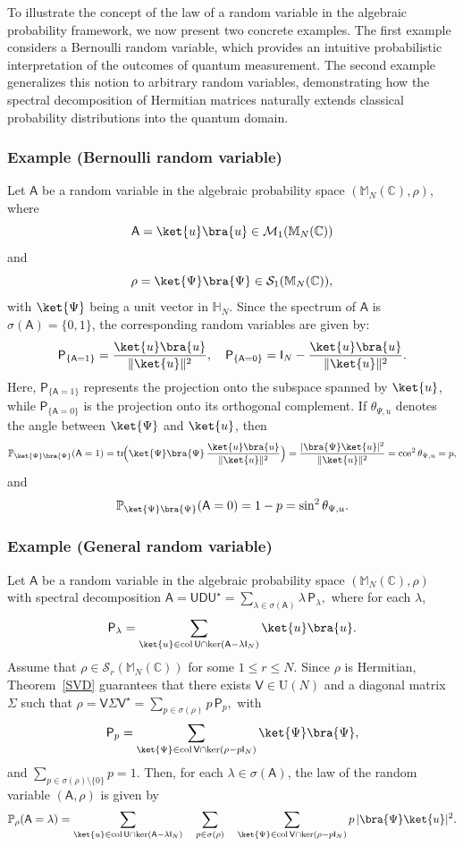 \documentclass[a4paper,11pt]{article}
\DeclareMathOperator{\tr}{tr}
\newcommand{\rD}{\mathsf{D}}
\newcommand{\rI}{\mathsf{I}}
\newcommand{\rP}{\mathsf{P}}
\newcommand{\rU}{\mathsf{U}}
\newcommand{\rV}{\mathsf{V}}
\newcommand{\rA}{\mathsf{A}}
\begin{document}
To illustrate the concept of the law of a random variable in the algebraic probability framework, we now present two concrete examples. The first example considers a Bernoulli random variable, which provides an intuitive probabilistic interpretation of the outcomes of quantum measurement. The second example generalizes this notion to arbitrary random variables, demonstrating how the spectral decomposition of Hermitian matrices naturally extends classical probability distributions into the quantum domain.

\subsubsection{Example (Bernoulli random variable)}
Let \(\rA\) be a random variable in the algebraic probability space \((\mathbb{M}_N(\mathbb{C}), \rho)\), where  
\[
\rA = \ket{u}\bra{u} \in \mathcal{M}_1(\mathbb{M}_N(\mathbb{C}))
\]
and  
\[
\rho = \ket{\Psi}\bra{\Psi} \in \mathcal{S}_1(\mathbb{M}_N(\mathbb{C})),
\]
with \(\ket{\Psi}\) being a unit vector in \(\mathbb{H}_N\).  
Since the spectrum of \(\rA\) is \(\sigma(\rA) = \{0,1\}\), the corresponding random variables are given by:
\[
\rP_{\{\rA = 1\}} = \frac{\ket{u}\bra{u}}{\|\ket{u}\|^2}, \quad
\rP_{\{\rA = 0\}} = \rI_N - \frac{\ket{u}\bra{u}}{\|\ket{u}\|^2}.
\]
Here, \(\rP_{\{\rA = 1\}}\) represents the projection onto the subspace spanned by  \(\ket{u}\), while \(\rP_{\{\rA = 0\}}\) is the projection onto its orthogonal complement.
If \(\theta_{\Psi,u}\) denotes the angle between \(\ket{\Psi}\) and \(\ket{u}\), then
\[
\mathbb{P}_{\ket{\Psi}\bra{\Psi}}(\rA = 1) = \tr\!\Bigl(\ket{\Psi}\bra{\Psi}\,\frac{\ket{u}\bra{u}}{\|\ket{u}\|^2}\Bigr)
= \frac{|\bra{\Psi}\ket{u}|^2}{\|\ket{u}\|^2} = \cos^2\theta_{\Psi,u} = p,
\]
and
\[
\mathbb{P}_{\ket{\Psi}\bra{\Psi}}(\rA = 0) = 1 - p = \sin^2\theta_{\Psi,u}.
\]

\subsubsection{Example (General random variable)}
Let \(\rA\) be a random variable in the algebraic probability space \((\mathbb{M}_N(\mathbb{C}), \rho)\) with spectral decomposition
\(
\rA = \rU \rD \rU^{\star} = \sum_{\lambda \in \sigma(\rA)} \lambda\, \rP_\lambda,
\)
where for each \(\lambda\),
\[
\rP_\lambda = \sum_{\ket{u} \in \mathrm{col}\,\rU \cap \ker(\rA-\lambda \rI_N)} \ket{u}\bra{u}.
\]
Assume that \(\rho \in \mathcal{S}_r(\mathbb{M}_N(\mathbb{C}))\) for some \(1 \le r \le N\). Since \(\rho\) is Hermitian, Theorem~\ref{SVD} guarantees that there exists \(\rV \in \mathrm{U}(N)\) and a diagonal matrix $\Sigma$ such that
\(
\rho = \rV \Sigma \rV^{\star} = \sum_{p \in \sigma(\rho)} p\, \rP_{p},
\)
with
\[
\rP_{p} = \sum_{\ket{\Psi} \in \mathrm{col}\,\rV \cap \ker(\rho-p \rI_N)} \ket{\Psi}\bra{\Psi},
\]
and
\(
\sum_{p \in \sigma(\rho)\setminus\{0\}} p = 1.
\)
Then, for each \(\lambda \in \sigma(\rA)\), the law of the random variable \((\rA,\rho)\) is given by
\[
\mathbb{P}_{\rho}(\rA = \lambda)
= \sum_{\ket{u} \in \mathrm{col}\,\rU \cap \ker(\rA-\lambda \rI_N)}  \quad \sum_{p \in \sigma(\rho)} \quad\sum_{\ket{\Psi} \in \mathrm{col}\,\rV \cap \ker(\rho-p \rI_N)}  p\, |\bra{\Psi}\ket{u}|^2.
\]
\end{document}
